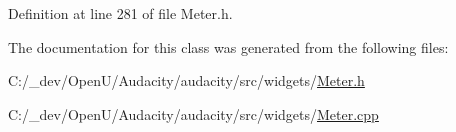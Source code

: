 Definition at line 281 of file Meter.\+h.



The documentation for this class was generated from the following files\+:\begin{DoxyCompactItemize}
\item 
C\+:/\+\_\+dev/\+Open\+U/\+Audacity/audacity/src/widgets/\hyperlink{_meter_8h}{Meter.\+h}\item 
C\+:/\+\_\+dev/\+Open\+U/\+Audacity/audacity/src/widgets/\hyperlink{_meter_8cpp}{Meter.\+cpp}\end{DoxyCompactItemize}
